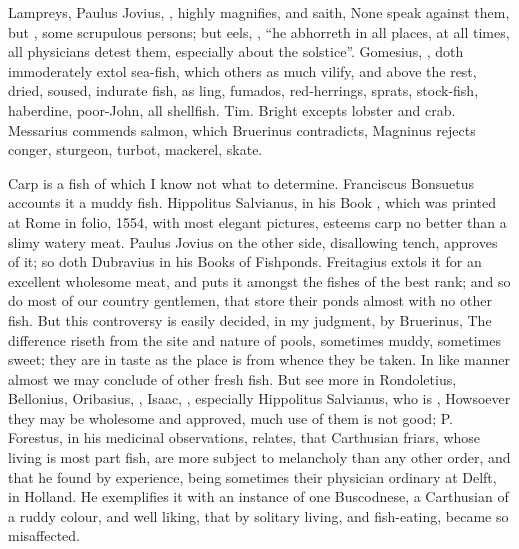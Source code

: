 Lampreys, Paulus Jovius, ,
highly magnifies, and saith, None speak against them, but , some scrupulous persons; but eels,
, \enquote{he abhorreth in all places, at all times, all
physicians detest them, especially about the solstice}. Gomesius,
, doth immoderately extol
sea-fish, which others as much vilify, and above the rest, dried, soused,
indurate fish, as ling, fumados, red-herrings, sprats, stock-fish, haberdine,
poor-John, all shellfish. Tim. Bright excepts lobster and
crab. Messarius commends salmon, which Bruerinus contradicts,
 Magninus rejects conger, sturgeon,
turbot, mackerel, skate.

Carp is a fish of which I know not what to determine. Franciscus Bonsuetus
accounts it a muddy fish. Hippolitus Salvianus, in his Book
, which was printed at
Rome in folio, 1554, with most elegant pictures, esteems carp no better than a
slimy watery meat. Paulus Jovius on the other side, disallowing tench, approves
of it; so doth Dubravius in his Books of Fishponds. Freitagius
extols it for an excellent wholesome meat, and puts it
amongst the fishes of the best rank; and so do most of our country gentlemen,
that store their ponds almost with no other fish. But this controversy is
easily decided, in my judgment, by Bruerinus,  The difference riseth from the site and nature of pools,
sometimes muddy, sometimes sweet; they are in taste as the
place is from whence they be taken. In like manner almost we may conclude of
other fresh fish. But see more in Rondoletius, Bellonius, Oribasius,
, Isaac, ,
especially Hippolitus Salvianus, who is , \etc{}
Howsoever they may be wholesome and approved, much use of them is not good; P.
Forestus, in his medicinal observations, relates, that
Carthusian friars, whose living is most part fish, are more subject to
melancholy than any other order, and that he found by experience, being
sometimes their physician ordinary at Delft, in Holland. He exemplifies it with
an instance of one Buscodnese, a Carthusian of a ruddy colour, and well liking,
that by solitary living, and fish-eating, became so misaffected.


